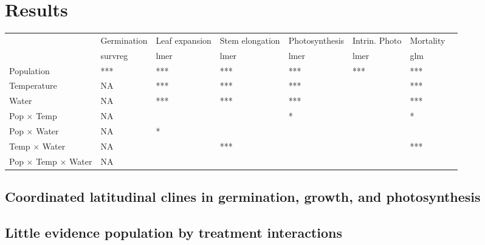 \documentclass[11pt, oneside]{article}\usepackage[]{graphicx}\usepackage[]{color}
\begin{document}
\section*{Results}

\begin{table}[ht]
   \centering
   \begin{tabular}{@{} llllllll @{}}
      \toprule
                                   & Germination & Leaf expansion & Stem elongation & Photosynthesis & Intrin. Photo & Mortality \\
                                   & survreg     & lmer           & lmer            & lmer           & lmer          & glm \\
      \midrule
  Population                       &
    ***  &
    *** &
    *** &
    *** & 
    *** & 
    *** & \\
  Temperature                      &
    NA                                                          &
    ***    &
    *** &
    *** & 
     &     *** & \\
  Water                            &
    NA                                                          &
    ***   &
    ***   &
    *** & 
     &     
    *** & \\
  Pop $\times$ Temp                &
    NA                                                          &
     &
     &
    * & 
     &     
    * & \\
  Pop $\times$ Water               &
     NA                                                          &
    * &
     &
     & 
     &     
     & \\
  Temp $\times$ Water              &
    NA                                                          &
     &
    *** &
     & 
     &     
    *** & \\
  Pop $\times$ Temp $\times$ Water &
    NA                                                          &
     &
     &
     & 
     &     
     & \\
      \bottomrule
   \end{tabular}
\end{table}

\subsection*{Coordinated latitudinal clines in germination, growth, and photosynthesis}

\subsection*{Little evidence population by treatment interactions}
\end{document}
